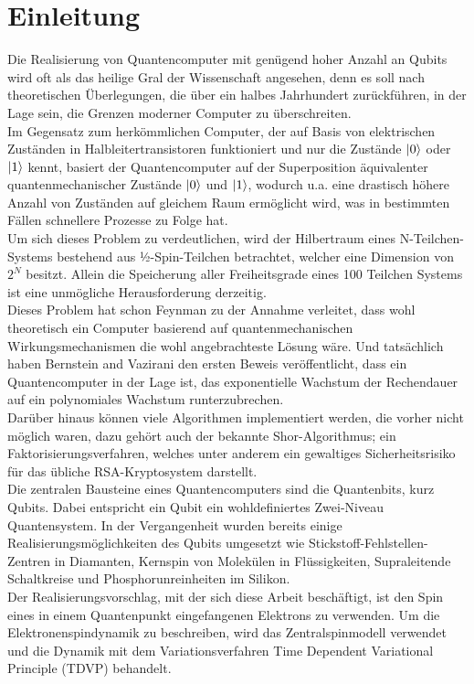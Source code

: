 \chapter{Einleitung}
Die Realisierung von Quantencomputer mit genügend hoher Anzahl an Qubits wird oft als das \glqq heilige Gral der Wissenschaft\grqq{} angesehen, denn 
es soll nach theoretischen Überlegungen, die über ein halbes Jahrhundert zurückführen, in der Lage sein, die Grenzen moderner Computer zu 
überschreiten. \\
Im Gegensatz zum herkömmlichen Computer, der auf Basis von elektrischen Zuständen in Halbleitertransistoren funktioniert 
und nur die Zustände $\ket{0}$ oder $\ket{1}$ kennt, basiert der Quantencomputer auf der Superposition äquivalenter 
quantenmechanischer Zustände $\ket{0}$ und $\ket{1}$, wodurch u.a. eine drastisch höhere Anzahl von Zuständen auf gleichem Raum ermöglicht 
wird, was in bestimmten Fällen schnellere Prozesse zu Folge hat.\\
Um sich dieses Problem zu verdeutlichen, wird der Hilbertraum eines N-Teilchen-Systems bestehend aus ½-Spin-Teilchen betrachtet, welcher eine 
Dimension von $2^N$ besitzt. Allein die Speicherung aller Freiheitsgrade eines 100 Teilchen Systems ist eine unmögliche Herausforderung
derzeitig. \\
Dieses Problem hat schon Feynman zu der Annahme verleitet, dass wohl theoretisch ein Computer basierend 
auf quantenmechanischen Wirkungsmechanismen die wohl angebrachteste Lösung wäre. Und tatsächlich haben Bernstein and Vazirani 
den ersten Beweis veröffentlicht, dass ein Quantencomputer in der Lage ist, das exponentielle Wachstum der Rechendauer auf ein 
polynomiales Wachstum runterzubrechen\cite{10.1145/167088.167097}.\\
Darüber hinaus können viele Algorithmen implementiert werden, die vorher nicht möglich waren, dazu gehört auch der bekannte Shor-Algorithmus; 
ein Faktorisierungsverfahren, welches unter anderem ein gewaltiges Sicherheitsrisiko für das übliche RSA-Kryptosystem darstellt\cite{365700,10.1137/S0097539795293172}.\\

\noindent Die zentralen Bausteine eines Quantencomputers sind die Quantenbits, kurz Qubits. Dabei entspricht ein Qubit ein wohldefiniertes
Zwei-Niveau Quantensystem. In der Vergangenheit wurden bereits einige Realisierungsmöglichkeiten des Qubits umgesetzt wie Stickstoff-Fehlstellen-Zentren 
in Diamanten\cite{PhysRevLett.93.130501,Hanson2008-tn}, Kernspin von Molekülen in Flüssigkeiten\cite{RevModPhys.76.1037},
Supraleitende Schaltkreise\cite{RevModPhys.73.357} und Phosphorunreinheiten im Silikon\cite{Kane1998-pc}.\\
Der Realisierungsvorschlag, mit der sich diese Arbeit beschäftigt, ist den Spin eines in einem Quantenpunkt eingefangenen 
Elektrons zu verwenden\cite{Elzerman2004-wu,Bonadeo1998-nr,PMID:17901328,Fokina_2010,Spatzek2011-rn}. Um die Elektronenspindynamik zu beschreiben, wird 
das Zentralspinmodell verwendet und die Dynamik mit dem Variationsverfahren \glqq Time Dependent Variational Principle\grqq{} (TDVP) behandelt.\\

